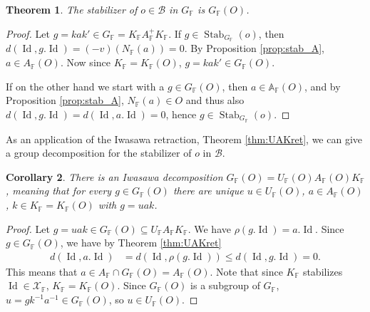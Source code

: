 \documentclass[12pt]{amsart}
\newcommand{\F}{\mathbb{F} }
\newcommand{\X}{\mathcal{X}}
\newcommand{\Ap}{A^+}
\newcommand{\A}{\mathbb{A}}
\newcommand{\B}{\mathcal{B}}
\numberwithin{equation}{section}
\newtheorem{theorem}{Theorem}[section]
\newtheorem{corollary}[theorem]{Corollary}
\theoremstyle{remark} %
\begin{document}
\begin{theorem}\label{thm:stab} 
	The stabilizer of $o\in\B$ in $G_\F$ is $G_\F(O) $.
\end{theorem}
\begin{proof}	
	Let $g=kak' \in G_\F = K_\F \Ap_\F K_\F$. If $g\in \operatorname{Stab}_{G_\F}(o)$, then $d(\operatorname{Id},g.\operatorname{Id}) = (-v)(N_\F(a)) = 0$. By Proposition \ref{prop:stab_A}, $a \in A_\F(O)$. Now since $K_\F = K_\F(O)$, $g = kak' \in G_\F(O)$.
	
	If on the other hand we start with a $g\in G_\F(O)$, then $a\in \A_\F(O)$, and by Proposition \ref{prop:stab_A}, $N_\F(a) \in O$ and thus also $d(\operatorname{Id},g.\operatorname{Id}) =d(\operatorname{Id},a.\operatorname{Id}) =0 $, hence $g \in \operatorname{Stab}_{G_\F}(o)$.
\end{proof}



As an application of the Iwasawa retraction, Theorem \ref{thm:UAKret}, we can give a group decomposition for the stabilizer of $o$ in $\B$.

\begin{corollary}\label{cor:UAKO}
	There is an Iwasawa decomposition $G_\F(O) = U_\F(O) A_\F(O) K_\F$, meaning that for every $g \in G_\F(O)$ there are unique $u \in U_\F(O)$, $a\in A_\F(O)$, $k\in K_\F=K_\F(O)$ with $g=uak$.
\end{corollary}
\begin{proof}
	Let $g=uak \in G_\F(O) \subseteq  U_\F A_\F K_\F$. We have $\rho(g.\operatorname{Id}) = a.\operatorname{Id}$. Since $g\in G_\F(O)$, we have by Theorem \ref{thm:UAKret}
	\begin{align*}
		d(\operatorname{Id},a.\operatorname{Id}) &= d(\operatorname{Id}, \rho(g.\operatorname{Id}))  \leq  d(\operatorname{Id}, g.\operatorname{Id}) = 0.
	\end{align*}
	This means that $a \in A_\F \cap G_\F(O) = A_\F(O)$. Note that since $K_\F$ stabilizes $\operatorname{Id}\in \X_\F$, $K_\F=K_\F(O)$. Since $G_\F(O)$ is a subgroup of $G_\F$, $u = gk^{-1}a^{-1} \in G_\F(O)$, so $u \in U_{\F}(O)$.
\end{proof}
\end{document}
